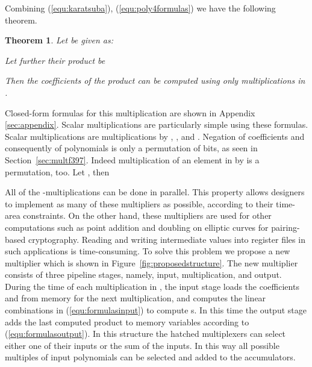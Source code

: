 \documentclass{article}
\newtheorem{thm}{Theorem}
\begin{document}
Combining (\ref{equ:karatsuba}), (\ref{equ:poly4formulas}) we have the
following theorem.

\begin{thm}
Let  be given as:

Let further their product  be 

Then the coefficients  of the product can be computed
using only  multiplications in .
\end{thm}

Closed-form formulas for this multiplication are shown in Appendix
\ref{sec:appendix}. Scalar multiplications are particularly simple
using these formulas. Scalar multiplications are multiplications by
, , and . Negation of coefficients and consequently of
polynomials is only a permutation of bits, as seen in
Section~\ref{sec:multf397}.
Indeed multiplication of an element in  by  is
a permutation, too. 
Let , then
 

All of the -multiplications can be done in parallel. This
property allows designers to implement as many of these multipliers as
possible, according to their time-area constraints. On the other hand,
these multipliers are used for other computations such as point
addition and doubling on elliptic curves for pairing-based
cryptography. Reading and writing intermediate values into register
files in such applications is time-consuming. 
To solve this problem we propose a new multiplier which is shown in Figure~\ref{fig:proposedstructure}. 
The new multiplier consists of three pipeline stages, namely, input, multiplication, and output. 
During the time of each multiplication in , the input stage loads the coefficients  and  from memory for the next multiplication, and computes the linear combinations in (\ref{equ:formulasinput}) to compute s.
In this time the output stage adds the last computed product  to memory variables according to (\ref{equ:formulasoutput}). 
In this structure the hatched multiplexers can select either one of their
inputs or the sum of the inputs. In this way all possible multiples of
input polynomials can be selected and added to the accumulators.
\end{document}
